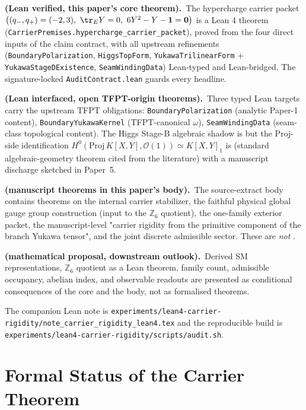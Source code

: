 \begin{tfptstatusbox}
\textbf{ (Lean verified, this paper's core theorem).}\
The hypercharge carrier packet
$\bigl((q_-,q_+)=(-2,3),\ \tr_E Y = 0,\ 6 Y^2 - Y - \mathbf 1 = \mathbf 0\bigr)$
is a Lean 4 theorem
(\texttt{CarrierPremises.hypercharge\_carrier\_packet}),
proved from the four direct inputs of the claim contract,
with all upstream refinements (\texttt{BoundaryPolarization},
\texttt{HiggsTopForm}, \texttt{YukawaTrilinearForm} +
\texttt{YukawaStageDExistence}, \texttt{SeamWindingData})
Lean-typed and Lean-bridged. The signature-locked
\texttt{AuditContract.lean} guards every headline.

\smallskip
\textbf{ (Lean interfaced, open TFPT-origin theorems).}\
Three typed Lean targets carry the upstream TFPT obligations:
\texttt{BoundaryPolarization} (analytic Paper-1 content),
\texttt{BoundaryYukawaKernel} (TFPT-canonical $\omega$),
\texttt{SeamWindingData} (seam-class topological content).
The Higgs Stage-B algebraic shadow is \stag{L} but the
$\mathrm{Proj}$-side identification
$H^0(\mathrm{Proj}\,K[X,Y], \mathcal O(1)) \simeq K[X,Y]_1$
is \stag{S} (standard algebraic-geometry theorem cited from
the literature) with a manuscript discharge sketched in
Paper~5.

\smallskip
\textbf{ (manuscript theorems in this paper's body).}\
The source-extract body contains  theorems on the
internal carrier stabilizer, the faithful physical global
gauge group construction (input to the $\mathbb Z_6$ quotient),
the one-family exterior packet, the manuscript-level
"carrier rigidity from the primitive component of the branch
Yukawa tensor", and the joint discrete admissible sector.
These are \emph{not} .

\smallskip
\textbf{ (mathematical proposal, downstream outlook).}\
Derived SM representations, $\mathbb Z_6$ quotient as a Lean
theorem, family count, admissible occupancy, abelian index,
and observable readouts are presented as conditional
consequences of the \stag{L} core and the \stag{M} body,
not as formalised theorems.

\smallskip
The companion Lean note is
\texttt{experiments/lean4-carrier-rigidity/note\_carrier\_rigidity\_lean4.tex}
and the reproducible build is
\texttt{experiments/lean4-carrier-rigidity/scripts/audit.sh}.
\end{tfptstatusbox}

\tableofcontents

\section{Formal Status of the Carrier Theorem}
\label{sec:formal-status}

